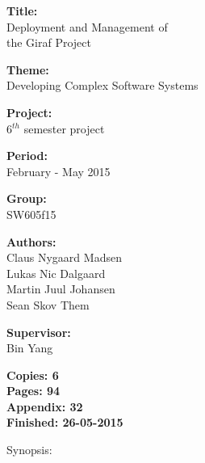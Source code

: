 \begin{minipage}[t]{0.48\textwidth}
\textbf{Title:} \\[5pt]\smallskip\hspace{2ex}
Deployment and Management of\\\bigskip\hspace{2ex}
the Giraf Project

\textbf{Theme:} \\[5pt]\bigskip\hspace{2ex}
Developing Complex Software Systems

\textbf{Project:} \\[5pt]\bigskip\hspace{2ex}
6$^{th}$ semester project

\textbf{Period:} \\[5pt]\bigskip\hspace{2ex}
February - May 2015

\textbf{Group:} \\[5pt]\bigskip\hspace{2ex}
SW605f15	

\textbf{Authors:} \\[5pt]\hspace*{2ex}
Claus Nygaard Madsen\\\hspace*{2ex}
Lukas Nic Dalgaard \\\hspace*{2ex}
Martin Juul Johansen \\\hspace*{2ex}
Sean Skov Them \\\hspace*{2ex}

\textbf{Supervisor:} \\[5pt]\hspace*{2ex}
Bin Yang \\\bigskip\hspace{2ex}

\textbf{Copies: 6} \\
\textbf{Pages: 94} \\
\textbf{Appendix: 32} \\ 
\textbf{Finished: 26-05-2015}

\end{minipage}
\hfill
\begin{minipage}[t]{0.5\textwidth}
\vspace{1cm}
Synopsis: \\[5pt]
\fbox{\parbox{7cm}{\bigskip\bigskip}} %
\end{minipage}

